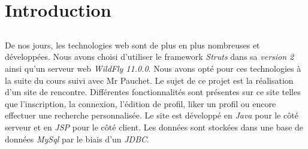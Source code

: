 \chapter{Introduction}

\section*{}
De nos jours, les technologies web sont de plus en plus nombreuses et développées.
Nous avons choisi d'utiliser le framework \textit{Struts} dans sa \textit{version 2} ainsi qu'un serveur web \textit{WildFly 11.0.0}.
Nous avons opté pour ces technologies à la suite du cours suivi avec Mr Pauchet.
Le sujet de ce projet est la réalisation d'un site de rencontre.
Différentes fonctionnalités sont présentes sur ce site telles que l'inscription, la connexion, l'édition de profil, liker un profil ou encore effectuer une recherche personnalisée.
Le site est développé en \textit{Java} pour le côté serveur et en \textit{JSP} pour le côté client.
Les données sont stockées dans une base de données \textit{MySql} par le biais d'un \textit{JDBC}.
\section*{}

